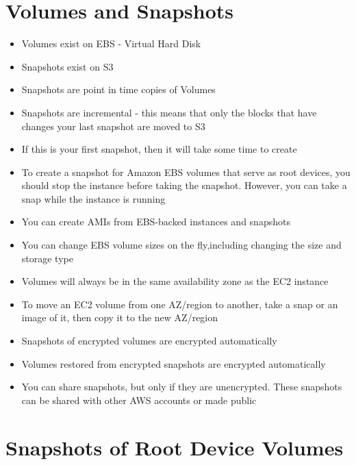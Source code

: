 \documentclass{article}
\begin{document}
\section{Volumes and Snapshots}
\begin{itemize}
\item
Volumes exist on EBS - Virtual Hard Disk

\item
Snapshots exist on S3

\item
Snapshots are point in time copies of Volumes

\item
Snapshots are incremental - this means that only the blocks that have changes your last snapshot are moved to S3

\item
If this is your first snapshot, then it will take some time to create

\item
To create a snapshot for Amazon EBS volumes that serve as root devices, you should stop the instance before taking the snapshot. However, you can take a snap while the instance is running

\item
You can create AMIs from EBS-backed instances and snapshots

\item
You can change EBS volume sizes on the fly,including changing the size and storage type

\item
Volumes will always be in the same availability zone as the EC2 instance

\item
To move an EC2 volume from one AZ/region to another, take a snap or an image of it, then copy it to the new AZ/region

\item
Snapshots of encrypted volumes are encrypted automatically

\item
Volumes restored from encrypted snapshots are encrypted automatically

\item
You can share snapshots, but only if they are unencrypted. These snapshots can be shared with other AWS accounts or made public


\end{itemize}

\section{Snapshots of Root Device Volumes}
\end{document}
